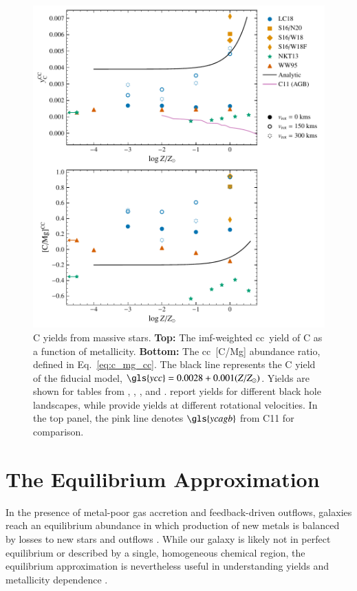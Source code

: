 \documentclass[12pt,oneside,letterpaper]{report}
\newcommand{\cc}{\gls{cc}}
\newcommand{\imf}{\gls{imf}}
\newcommand{\Ycc}{\gls{ycc}}
\newcommand{\Ycagb}{\gls{ycagb}}
\begin{document}
\begin{figure}[htp]
    \centering
    \includegraphics{y_c_cc.pdf}
    \caption[Massive star C yields]{
        C yields from massive stars.
        \textbf{Top:} The \imf-weighted \cc\ yield of C as a function of metallicity.
        \textbf{Bottom:} The \cc\ [C/Mg] abundance ratio, defined in Eq.~\ref{eq:c_mg_cc}. The black line represents the C yield of the fiducial model,
    $\Ycc = 0.0028 + 0.001 (Z/Z_{\odot})$. Yields are shown for tables from 
    \citet[red triangles]{WW95}, \citet[orange squares and diamonds]{sukhbold+16}, 
    \citet[green stars]{NKT13}, and \citet[blue circles]{LC18}. \citet{sukhbold+16} report yields for different black hole landscapes, while \citet{LC18} provide yields at different rotational velocities.
In the top panel, the pink line denotes $\Ycagb$ from C11 for comparison.
}
    \label{fig:y_cc}
\end{figure}

\chapter{The Equilibrium Approximation}\label{sec:equilibrium}

In the presence of metal-poor gas accretion and feedback-driven outflows, galaxies reach an equilibrium abundance in which production of new metals is balanced by losses to new stars and outflows \citep{larson72, dalcanton07, FD08, PS11, lilly13}.
While our galaxy is likely not in perfect equilibrium or described by a single, homogeneous chemical region, the equilibrium approximation is nevertheless useful in understanding yields and metallicity dependence \citep[e.g.][]{james_dwarf,james+23,WAF17}. 
\end{document}
